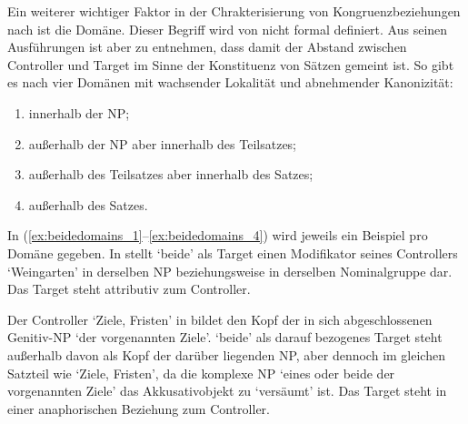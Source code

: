 Ein weiterer wichtiger Faktor in der Chrakterisierung von Kongruenzbeziehungen
nach \citet{corbett2006} ist die Domäne. Dieser Begriff wird von
\citet{corbett2006} nicht formal definiert. Aus seinen Ausführungen ist aber zu
entnehmen, dass damit der Abstand zwischen Controller und Target im Sinne der
Konstituenz von Sätzen gemeint ist. So gibt es nach \citet[54]{corbett2006}
vier Domänen mit wachsender Lokalität und abnehmender Kanonizität:

\begin{enumerate}[noitemsep]
	\item innerhalb der NP;
	\item außerhalb der NP aber innerhalb des Teilsatzes;
	\item außerhalb des Teilsatzes aber innerhalb des Satzes;
	\item außerhalb des Satzes.
\end{enumerate}

In (\ref{ex:beidedomains_1}--\ref{ex:beidedomains_4}) wird jeweils ein Beispiel
pro Domäne gegeben. In  stellt  `beide' als
Target einen Modifikator seines Controllers  `Weingarten' in
derselben NP beziehungsweise in derselben Nominalgruppe dar. Das Target steht
attributiv zum Controller.


Der Controller  `Ziele, Fristen' in  bildet
den Kopf der in sich abgeschlossenen Genitiv-NP  `der
vorgenannten Ziele'.  `beide' als darauf bezogenes
Target steht außerhalb davon als Kopf der darüber liegenden NP, aber dennoch im
gleichen Satzteil wie  `Ziele, Fristen', da die komplexe NP
 `eines oder beide der
vorgenannten Ziele' das Akkusativobjekt zu  `versäumt'
ist. Das Target steht in einer anaphorischen Beziehung zum Controller.


